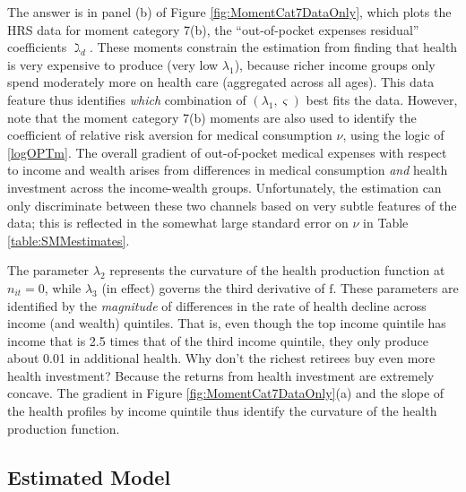 \documentclass[12pt,pdftex,letterpaper]{article}
\newcommand{\Invst}{n}
\newcommand{\LifeUtility}{\varsigma}
\newcommand{\CRRAcare}{\nu}
\newcommand{\HealthProdFunc}{\text{f}}
\newcommand{\HealthProdParamAlt}{\lambda}
\begin{document}
The answer is in panel (b) of Figure \ref{fig:MomentCat7DataOnly}, which plots the HRS data for moment category 7(b), the ``out-of-pocket expenses residual'' coefficients $\gimel_d$.  These moments constrain the estimation from finding that health is very expensive to produce (very low $\HealthProdParamAlt_1$), because richer income groups only spend moderately more on health care (aggregated across all ages).  This data feature thus identifies \textit{which} combination of $(\HealthProdParamAlt_1,\LifeUtility)$ best fits the data.  However, note that the moment category 7(b) moments are also used to identify the coefficient of relative risk aversion for medical consumption $\CRRAcare$, using the logic of \eqref{logOPTm}.  The overall gradient of out-of-pocket medical expenses with respect to income and wealth arises from differences in medical consumption \textit{and} health investment across the income-wealth groups. Unfortunately, the estimation can only discriminate between these two channels based on very subtle features of the data; this is reflected in the somewhat large standard error on $\CRRAcare$ in Table \ref{table:SMMestimates}.

The parameter $\HealthProdParamAlt_2$ represents the curvature of the health production function at $\Invst_{it}=0$, while $\HealthProdParamAlt_3$ (in effect) governs the third derivative of $\HealthProdFunc$.  These parameters are identified by the \textit{magnitude} of differences in the rate of health decline across income (and wealth) quintiles.  That is, even though the top income quintile has income that is 2.5 times that of the third income quintile, they only produce about 0.01 in additional health.  Why don't the richest retirees buy even more health investment?  Because the returns from health investment are extremely concave.  The gradient in Figure \ref{fig:MomentCat7DataOnly}(a) and the slope of the health profiles by income quintile thus identify the curvature of the health production function.


\subsection{Estimated Model}
\label{sec:EstModel}
\end{document}
